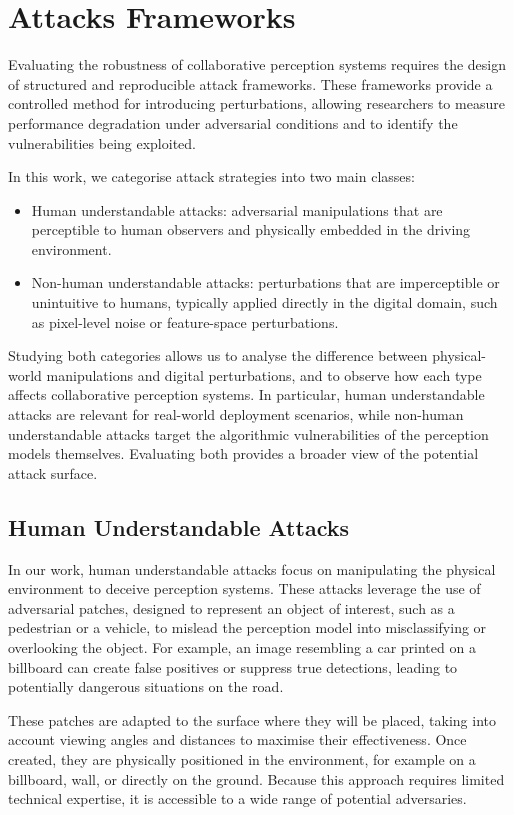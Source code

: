 \chapter{Attacks Frameworks}
\label{Attacks Frameworks}

Evaluating the robustness of collaborative perception systems requires the design of structured and reproducible attack frameworks.
These frameworks provide a controlled method for introducing perturbations, allowing researchers to measure performance degradation under adversarial conditions and to identify the vulnerabilities being exploited.

In this work, we categorise attack strategies into two main classes:
\begin{itemize}
    \item Human understandable attacks: adversarial manipulations that are perceptible to human observers and physically embedded in the driving environment.
    \item Non-human understandable attacks: perturbations that are imperceptible or unintuitive to humans, typically applied directly in the digital domain, such as pixel-level noise or feature-space perturbations.
\end{itemize}
Studying both categories allows us to analyse the difference between physical-world manipulations and digital perturbations, and to observe how each type affects collaborative perception systems.
In particular, human understandable attacks are relevant for real-world deployment scenarios, while non-human understandable attacks target the algorithmic vulnerabilities of the perception models themselves.
Evaluating both provides a broader view of the potential attack surface.

\section{Human Understandable Attacks}

In our work, human understandable attacks focus on manipulating the physical environment to deceive perception systems.
These attacks leverage the use of adversarial patches, designed to represent an object of interest, such as a pedestrian or a vehicle, to mislead the perception model into misclassifying or overlooking the object.
For example, an image resembling a car printed on a billboard can create false positives or suppress true detections, leading to potentially dangerous situations on the road.

These patches are adapted to the surface where they will be placed, taking into account viewing angles and distances to maximise their effectiveness.
Once created, they are physically positioned in the environment, for example on a billboard, wall, or directly on the ground.
Because this approach requires limited technical expertise, it is accessible to a wide range of potential adversaries.

